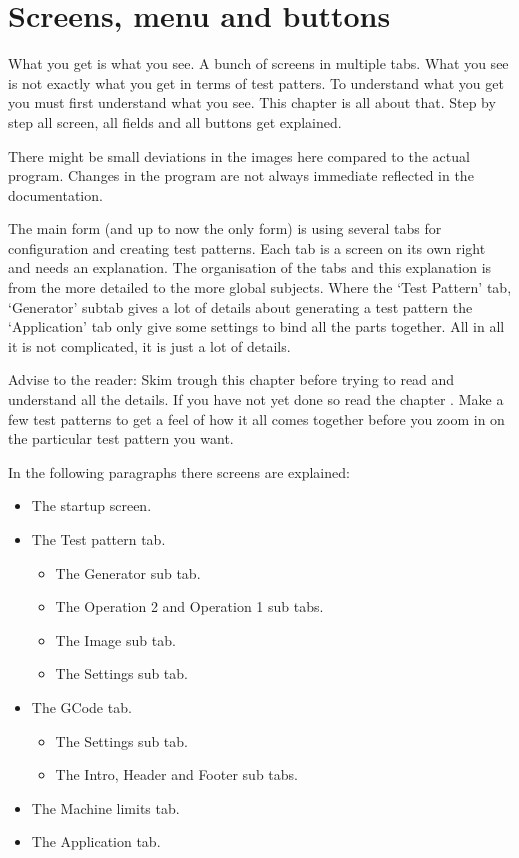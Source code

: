 \chapter{Screens, menu and buttons}\label{ScreensMenuButtons}

What you get is what you see. A bunch of screens in multiple tabs. What you see is not exactly what you get in terms of test patters.
To understand what you get you must first understand what you see. This chapter is all about that. Step by step all screen, all fields
and all buttons get explained.

There might be small deviations in the images here compared to the actual program. Changes in the program are not always immediate
reflected in the documentation.

The main form (and up to now the only form) is using several tabs for configuration and creating test patterns. Each tab is
a screen on its own right and needs an explanation. The organisation of the tabs and this explanation is from the more detailed
to the more global subjects. Where the `Test Pattern' tab, `Generator' subtab gives a lot of details about generating a test pattern
the `Application' tab only give some settings to bind all the parts together. All in all it is not complicated, it is just a lot of details.

Advise to the reader: Skim trough this chapter before trying to read and understand all the details. If you have not yet done so read the
chapter . Make a few test patterns to get a feel of how it all comes together before you zoom in on the particular test pattern
you want.

In the following paragraphs there screens are explained:
\begin{itemize}
    \item The startup screen.
    \item The Test pattern tab.
        \begin{itemize}
            \item The Generator sub tab.
            \item The Operation 2 and Operation 1 sub tabs.
            \item The Image sub tab.
            \item The Settings sub tab.
        \end{itemize}
    \item The GCode tab.
        \begin{itemize}
            \item The Settings sub tab.
            \item The Intro, Header and Footer sub tabs.
        \end{itemize}
    \item The Machine limits tab.
    \item The Application tab.
\end{itemize}

